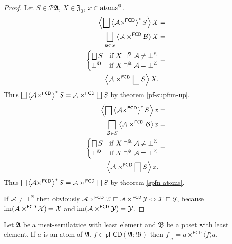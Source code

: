 \begin{proof}
Let $S\in\mathscr{P}\mathfrak{A}$, $X\in\mathfrak{Z}_{0}$, $x\in\operatorname{atoms}^{\mathfrak{A}}$.
\begin{align*}
\left\langle \bigsqcup\left\langle \mathcal{A}\times^{\mathsf{FCD}}\right\rangle ^{\ast}S\right\rangle X & =\\
\bigsqcup_{\mathcal{B}\in S}\left\langle \mathcal{A}\times^{\mathsf{FCD}}\mathcal{B}\right\rangle X & =\\
\begin{cases}
\bigsqcup S & \text{if }X\sqcap^{\mathfrak{A}}\mathcal{A}\ne\bot^{\mathfrak{A}}\\
\bot^{\mathfrak{B}} & \text{if }X\sqcap^{\mathfrak{A}}\mathcal{A}=\bot^{\mathfrak{A}}
\end{cases} & =\\
\left\langle \mathcal{A}\times^{\mathsf{FCD}}\bigsqcup S\right\rangle X.
\end{align*}
Thus $\bigsqcup\left\langle \mathcal{A}\times^{\mathsf{FCD}}\right\rangle ^{\ast}S=\mathcal{A}\times^{\mathsf{FCD}}\bigsqcup S$
by theorem \ref{pf-supfun-up}.
\begin{align*}
\left\langle \bigsqcap\left\langle \mathcal{A}\times^{\mathsf{FCD}}\right\rangle ^{\ast}S\right\rangle x & =\\
\bigsqcap_{\mathcal{B}\in S}\left\langle \mathcal{A}\times^{\mathsf{FCD}}\mathcal{B}\right\rangle x & =\\
\begin{cases}
\bigsqcap S & \text{if }X\sqcap^{\mathfrak{A}}\mathcal{A}\ne\bot^{\mathfrak{A}}\\
\bot^{\mathfrak{B}} & \text{if }X\sqcap^{\mathfrak{A}}\mathcal{A}=\bot^{\mathfrak{A}}
\end{cases} & =\\
\left\langle \mathcal{A}\times^{\mathsf{FCD}}\bigsqcap S\right\rangle x.
\end{align*}
Thus $\bigsqcap\left\langle \mathcal{A}\times^{\mathsf{FCD}}\right\rangle ^{\ast}S=\mathcal{A}\times^{\mathsf{FCD}}\bigsqcap S$
by theorem \ref{spfn-atoms}.

If $\mathcal{A}\neq\bot^{\mathfrak{A}}$ then obviously
$\mathcal{A}\times^{\mathsf{FCD}}\mathcal{X}\sqsubseteq\mathcal{A}\times^{\mathsf{FCD}}\mathcal{Y} \Leftrightarrow
\mathcal{X}\sqsubseteq\mathcal{Y}$, because $\operatorname{im}(\mathcal{A}\times^{\mathsf{FCD}}\mathcal{X})=\mathcal{X}$ and
$\operatorname{im}(\mathcal{A}\times^{\mathsf{FCD}}\mathcal{Y})=\mathcal{Y}$.\end{proof}
\begin{prop}
Let $\mathfrak{A}$ be a meet-semilattice with least element and $\mathfrak{B}$
be a poset with least element. If $a$ is an atom of $\mathfrak{A}$,
$f\in\mathsf{pFCD}(\mathfrak{A};\mathfrak{B})$ then $f|_{a}=a\times^{\mathsf{FCD}}\langle f\rangle a$.\end{prop}
